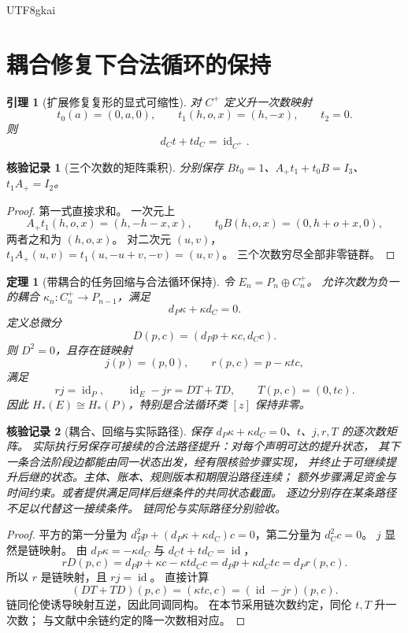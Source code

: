 \documentclass[12pt,a4paper,openany]{report}
\newtheorem{theorem}{定理}[chapter]
\newtheorem{lemma}{引理}[chapter]
\newtheorem{Certificate}{核验记录}[chapter]
\newcommand{\id}{\operatorname{id}}
\begin{document}
\begin{CJK*}{UTF8}{gkai}
\section{耦合修复下合法循环的保持}
\begin{lemma}[扩展修复复形的显式可缩性]
\label{lem:contractible}
对 \(C^+\) 定义升一次数映射
\[
t_0(a)=(0,a,0),\qquad
t_1(h,o,x)=(h,-x),\qquad t_2=0.
\]
则
\[
d_Ct+td_C=\id_{C^+}.
\]
\end{lemma}
\begin{Certificate}[三个次数的矩阵乘积]
分别保存 \(Bt_0=1\)、\(A_+t_1+t_0B=I_3\)、
\(t_1A_+=I_2\)。
\end{Certificate}
\begin{proof}
第一式直接求和。
一次元上
\[
A_+t_1(h,o,x)=(h,-h-x,x),\qquad
t_0B(h,o,x)=(0,h+o+x,0),
\]
两者之和为 \((h,o,x)\)。
对二次元 \((u,v)\)，
\(t_1A_+(u,v)=t_1(u,-u+v,-v)=(u,v)\)。
三个次数穷尽全部非零链群。
\end{proof}

\begin{theorem}[带耦合的任务回缩与合法循环保持]
\label{thm:coupled}
令 \(E_n=P_n\oplus C^+_n\)。
允许次数为负一的耦合
\(\kappa_n:C^+_n\to P_{n-1}\)，满足
\[
d_P\kappa+\kappa d_C=0.
\]
定义总微分
\[
D(p,c)=(d_Pp+\kappa c,d_Cc).
\]
则 \(D^2=0\)，且存在链映射
\[
j(p)=(p,0),\qquad r(p,c)=p-\kappa tc,
\]
满足
\[
rj=\id_P,\qquad
\id_E-jr=DT+TD,\qquad T(p,c)=(0,tc).
\]
因此 \(H_*(E)\cong H_*(P)\)，特别是合法循环类 \([z]\) 保持非零。
\end{theorem}
\begin{Certificate}[耦合、回缩与实际路径]
保存 \(d_P\kappa+\kappa d_C=0\)、\(t\)、\(j,r,T\) 的逐次数矩阵。
实际执行另保存可接续的合法路径提升：对每个声明可达的提升状态，
其下一条合法阶段边都能由同一状态出发，经有限核验步骤实现，
并终止于可继续提升后继的状态。主体、账本、规则版本和期限沿路径连续；
额外步骤满足资金与时间约束。或者提供满足同样后继条件的共同状态截面。
逐边分别存在某条路径不足以代替这一接续条件。
链同伦与实际路径分别验收。
\end{Certificate}
\begin{proof}
平方的第一分量为
\(d_P^2p+(d_P\kappa+\kappa d_C)c=0\)，第二分量为 \(d_C^2c=0\)。
\(j\) 显然是链映射。
由 \(d_P\kappa=-\kappa d_C\) 与 \(d_Ct+td_C=\id\)，
\[
rD(p,c)=d_Pp+\kappa c-\kappa td_Cc
=d_Pp+\kappa d_Ctc=d_Pr(p,c).
\]
所以 \(r\) 是链映射，且 \(rj=\id\)。
直接计算
\[
(DT+TD)(p,c)=(\kappa tc,c)=(\id-jr)(p,c).
\]
链同伦使诱导映射互逆，因此同调同构。
在本节采用链次数约定，同伦 \(t,T\) 升一次数；
与文献\cite{GRate}中余链约定的降一次数相对应。
\end{proof}


\end{CJK*}
\end{document}
